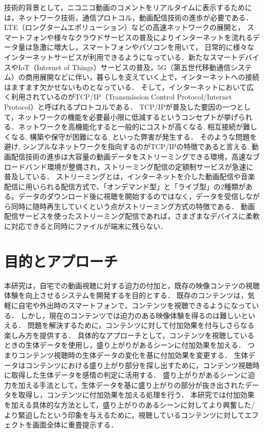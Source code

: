 技術的背景として，ニコニコ動画のコメントをリアルタイムに表示するためには，ネットワーク技術，通信プロトコル，動画配信技術の進歩が必要である．
LTE（ロングタームエボリューション）などの高速ネットワークの展開と， スマートフォンや様々なクラウドサービスの普及によりインターネットを流れるデータ量は急激に増大し，スマートフォンやパソコンを用いて，
日常的に様々なインターネットサービスが利用できるようになっている．新たなスマートデバイスやIoT（Internet of Things）サービスの普及，5G（第五世代移動通信システム）の商用展開などに伴い，暮らしを支えていく上で，インターネットへの接続はますます欠かせないものとなっている．
そして，インターネットにおいて広く利用されているのがTCP/IP（Transmission Control Protocol/Internet Protocol）と呼ばれるプロトコルである．
TCP/IPが普及した要因の一つとして，ネットワークの機能を必要最小限に低減するというコンセプトが挙げられる．ネットワークを高機能化すると一般的にコストが高くなる, 相互接続が難しくなる, 構築や保守が困難になる, といった弊害が発生する．
そのような問題を避け, シンプルなネットワークを指向するのがTCP/IPの特徴であると言える.
動画配信技術の進歩は大容量の動画データをストリーミングできる環境，高速なブロードバンド環境が整備され，ストリーミング配信の定額制サービスが急速に普及している．
ストリーミングとは，インターネットを介した動画配信や音楽配信に用いられる配信方式で、「オンデマンド型」と「ライブ型」の2種類がある。データのダウンロード後に視聴を開始するのではなく，データを受信しながら同時に随時再生していくという点がストリーミング方式の特徴である．
動画配信サービスを使ったストリーミング配信であれば，さまざまなデバイスに柔軟に対応できると同時にファイルが端末に残らない．

\section{目的とアプローチ}
本研究は，自宅での動画視聴に対する迫力の付加と，既存の映像コンテツの視聴体験を向上させるシステムを開発するを目的とする．
既存のコンテンツは，気軽に自宅や外出時のスマートフォンで，コンテンツを視聴できるようになっている．
しかし，現在のコンテンツでは迫力のある映像体験を得るのは難しいといえる．
問題を解決するために，コンテンツに対して付加効果を付与しさらなる楽しみ方を提供する．
具体的なアプローチとして，コンテンツを視聴しているときの生体データを使用し，盛り上がりがあるシーンに付加効果を加える．
つまりコンテンツ視聴時の生体データの変化を基に付加効果を変更する．
生体データはコンテンツにおける盛り上がり部分を探し出すために，コンテンツ視聴時に取得した生体データを感情の判定に活用する．
盛り上がりがあるシーンに迫力を加える手法として，生体データを基に盛り上がりの部分が抜き出されたデータを取得し，コンテンツに付加効果を加える処理を行う．
本研究では付加効果を加える具体的な方法として，盛り上がりのあるシーンに対してより興奮した/より緊迫したという印象を与えるために，視聴しているコンテンツに対してエフェクトを画面全体に重畳提示する．


